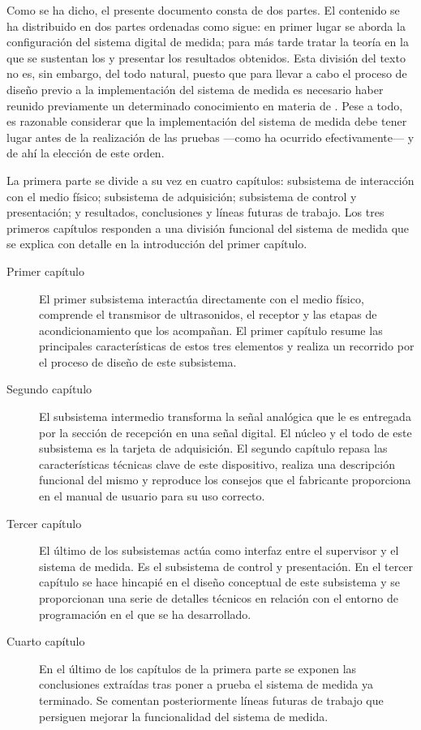 Como se ha dicho, el presente documento consta de dos partes. El contenido se ha distribuido en dos partes ordenadas como sigue: en primer lugar se aborda la configuración del sistema digital de medida; para más tarde tratar la teoría en la que se sustentan los  y presentar los resultados obtenidos. Esta división del texto no es, sin embargo, del todo natural, puesto que para llevar a cabo el proceso de diseño previo a la implementación del sistema de medida es necesario haber reunido previamente un determinado conocimiento en materia de . Pese a todo, es razonable considerar que la implementación del sistema de medida debe tener lugar antes de la realización de las pruebas ---como ha ocurrido efectivamente--- y de ahí la elección de este orden.\par
La primera parte se divide a su vez en cuatro capítulos: subsistema de interacción con el medio físico; subsistema de adquisición; subsistema de control y presentación; y resultados, conclusiones y líneas futuras de trabajo. Los tres primeros capítulos responden a una división funcional del sistema de medida que se explica con detalle en la introducción del primer capítulo.


\begin{description}
	\item[Primer capítulo] El primer subsistema interactúa directamente con el medio físico, comprende el transmisor de ultrasonidos, el receptor y las etapas de acondicionamiento que los acompañan. El primer capítulo resume las principales características de estos tres elementos y realiza un recorrido por el proceso de diseño de este subsistema.
	\item[Segundo capítulo] El subsistema intermedio transforma la señal analógica que le es entregada por la sección de recepción en una señal digital. El núcleo y el todo de este subsistema es la tarjeta de adquisición. El segundo capítulo repasa las características técnicas clave de este dispositivo, realiza una descripción funcional del mismo y reproduce los consejos que el fabricante proporciona en el manual de usuario para su uso correcto.
	\item[Tercer capítulo] El último de los subsistemas actúa como interfaz entre el supervisor y el sistema de medida. Es el subsistema de control y presentación. En el tercer capítulo se hace hincapié en el diseño conceptual de este subsistema y se proporcionan una serie de detalles técnicos en relación con el entorno de programación en el que se ha desarrollado.
	\item[Cuarto capítulo] En el último de los capítulos de la primera parte se exponen las conclusiones extraídas tras poner a prueba el sistema de medida ya terminado. Se comentan posteriormente líneas futuras de trabajo que persiguen mejorar la funcionalidad del sistema de medida.\par
\end{description}

